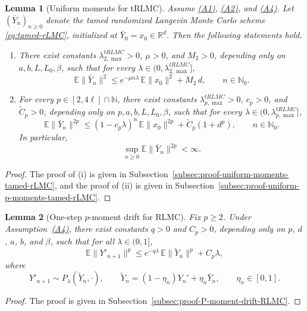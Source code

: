 \documentclass[11pt,a4paper,reqno]{amsart}
\theoremstyle{plain}
\newtheorem{lemma}{Lemma}
\theoremstyle{definition}
\theoremstyle{remark}
\newcommand{\R}{\mathbb{R}}
\newcommand{\E}{\mathbb{E}}
\begin{document}
\begin{lemma}[Uniform moments for tRLMC]
\label{lem:moment-tamed-rLMC}
Assume \hyperref[ass:PJG]{\textup{(A1)}}, \hyperref[ass:PLC]{\textup{(A2)}}, and
\hyperref[ass:D]{\textup{(A4)}}. Let \((\bar Y_n)_{n\ge0}\) denote the tamed randomized
Langevin Monte Carlo scheme \eqref{eq:tamed-rLMC}, initialized at
\(\bar Y_0=x_0\in\R^d\). Then the following statements hold.

\begin{enumerate}
\item
There exist constants \(\lambda_{2,\max}^{tRLMC}>0\), \(\mu>0\), and \(M_2>0\),
depending only on \(a,b,L,L_0,\beta\), such that for every
\(\lambda\in(0,\lambda_{2,\max}^{tRLMC}]\),
\[
\E\|\bar Y_n\|^2
\le
e^{-\mu n\lambda}\,\E\|x_0\|^2 + M_2\,d,
\qquad n\in\mathbb N_0.
\]

\item
For every \(p\in[2,4\ell]\cap\mathbb N\), there exist constants
\(\lambda_{p,\max}^{tRLMC}>0\), \(c_p>0\), and \(\widetilde C_p>0\), depending only on
\(p,a,b,L,L_0,\beta\), such that for every
\(\lambda\in(0,\lambda_{p,\max}^{tRLMC}]\),
\[
\E\|\bar Y_n\|^{2p}
\le
(1-c_p\lambda)^n\,\E\|x_0\|^{2p}
+
\widetilde C_p(1+d^p),
\qquad n\in\mathbb N_0.
\]
In particular,
\[
\sup_{n\ge0}\E\|\bar Y_n\|^{2p}<\infty.
\]
\end{enumerate}
\end{lemma}

\begin{proof}
The proof of \textup{(i)} is given in Subsection~\ref{subsec:proof-uniform-moments-tamed-rLMC},
and the proof of \textup{(ii)} is given in Subsection~\ref{subsec:proof-uniform-p-moments-tamed-rLMC}.
\end{proof}


\begin{lemma}[One-step \(p\)-moment drift for RLMC]
\label{lem:P-moment-drift-RLMC}
Fix \(p\ge 2\). Under Assumption~\hyperref[ass:D]{\textup{(A4)}}, there exist constants
\(q>0\) and \(C_p>0\), depending only on \(p\), \(d\), \(a\), \(b\), and \(\beta\), such that for all
\(\lambda\in(0,1]\),
\[
  \E\|Y'_{n+1}\|^p
  \le
  e^{-q\lambda}\,\E\|\widetilde Y_n\|^p
  +
  C_p\lambda,
\]
where
\[
  Y'_{n+1}\sim P_\lambda(\widetilde Y_n,\cdot),
  \qquad
  \widetilde Y_n=(1-\eta_n)Y_n' + \eta_n\bar Y_n,
  \qquad
  \eta_n\in[0,1].
\]
\end{lemma}

\begin{proof}
The proof is given in Subsection~\ref{subsec:proof-P-moment-drift-RLMC}.
\end{proof}
\end{document}
